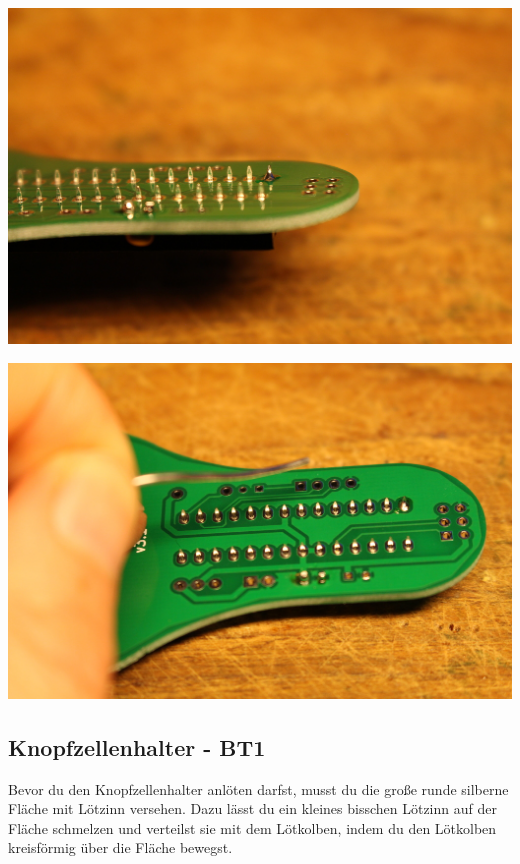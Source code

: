 \documentclass{article}
\begin{document}
\begin{minipage}[b]{0.5\textwidth}
	\includegraphics[width=\textwidth]{Bilder2021/IMG_8134.JPG}
\end{minipage}
\begin{minipage}[b]{0.5\textwidth}
	\includegraphics[width=\textwidth]{Bilder2021/IMG_8135.JPG}
\end{minipage}

\subsection{Knopfzellenhalter - BT1}

Bevor du den Knopfzellenhalter anlöten darfst, musst du die große runde silberne Fläche mit Lötzinn versehen. Dazu lässt du ein kleines bisschen Lötzinn auf der Fläche schmelzen und verteilst sie mit dem Lötkolben, indem du den Lötkolben kreisförmig über die Fläche bewegst.
\end{document}
